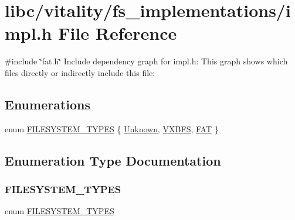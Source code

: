 \hypertarget{a00161}{}\section{libc/vitality/fs\+\_\+implementations/impl.h File Reference}
\label{a00161}
{\ttfamily \#include \char`\"{}fat.\+h\char`\"{}}\newline
Include dependency graph for impl.\+h\+:
This graph shows which files directly or indirectly include this file\+:
\subsection*{Enumerations}
\begin{DoxyCompactItemize}
\item 
enum \hyperlink{a00161_a2e9d0c3765a28910638672bfc746181b_a2e9d0c3765a28910638672bfc746181b}{F\+I\+L\+E\+S\+Y\+S\+T\+E\+M\+\_\+\+T\+Y\+P\+ES} \{ \hyperlink{a00161_a2e9d0c3765a28910638672bfc746181b_a2e9d0c3765a28910638672bfc746181ba4e81c184ac3ad48a389cd4454c4a05bb}{Unknown}, 
\hyperlink{a00161_a2e9d0c3765a28910638672bfc746181b_a2e9d0c3765a28910638672bfc746181bac740d3121d634c0d77f5602b1fdab236}{V\+X\+B\+FS}, 
\hyperlink{a00161_a2e9d0c3765a28910638672bfc746181b_a2e9d0c3765a28910638672bfc746181ba5bb1a436c641e5391d9474ed95f4f56a}{F\+AT}
 \}
\end{DoxyCompactItemize}


\subsection{Enumeration Type Documentation}
\mbox{\label{a00161_a2e9d0c3765a28910638672bfc746181b_a2e9d0c3765a28910638672bfc746181b}} 
\subsubsection{\texorpdfstring{F\+I\+L\+E\+S\+Y\+S\+T\+E\+M\+\_\+\+T\+Y\+P\+ES}{FILESYSTEM\_TYPES}}
{\footnotesize\ttfamily enum \hyperlink{a00161_a2e9d0c3765a28910638672bfc746181b_a2e9d0c3765a28910638672bfc746181b}{F\+I\+L\+E\+S\+Y\+S\+T\+E\+M\+\_\+\+T\+Y\+P\+ES}}

